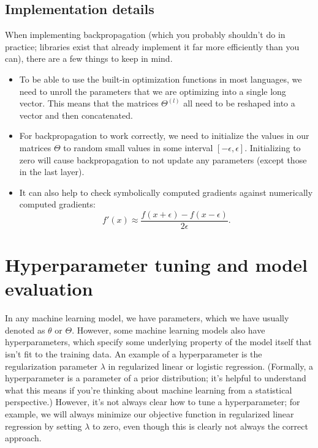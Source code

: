 \documentclass{article}
\begin{document}
\subsection{Implementation details}
When implementing backpropagation (which you probably shouldn't do in practice; libraries exist that already implement it far more efficiently than you can), there are a few things to keep in mind.
\begin{itemize}
\item To be able to use the built-in optimization functions in most languages, we need to unroll the parameters that we are optimizing into a single long vector. This means that the matrices $\Theta^{(l)}$ all need to be reshaped into a vector and then concatenated.
\item For backpropagation to work correctly, we need to initialize the values in our matrices $\Theta$ to random small values in some interval $[-\epsilon, \epsilon]$. Initializing to zero will cause backpropagation to not update any parameters (except those in the last layer).
\item It can also help to check symbolically computed gradients against numerically computed gradients:
$$f'(x) \approx \frac{f(x + \epsilon) - f(x - \epsilon)}{2\epsilon}.$$
\end{itemize}

\section{Hyperparameter tuning and model evaluation}
In any machine learning model, we have parameters, which we have usually denoted as $\theta$ or $\Theta$. However, some machine learning models also have hyperparameters, which specify some underlying property of the model itself that isn't fit to the training data. An example of a hyperparameter is the regularization parameter $\lambda$ in regularized linear or logistic regression. (Formally, a hyperparameter is a parameter of a prior distribution; it's helpful to understand what this means if you're thinking about machine learning from a statistical perspective.) However, it's not always clear how to tune a hyperparameter; for example, we will always minimize our objective function in regularized linear regression by setting $\lambda$ to zero, even though this is clearly not always the correct approach.
\end{document}
